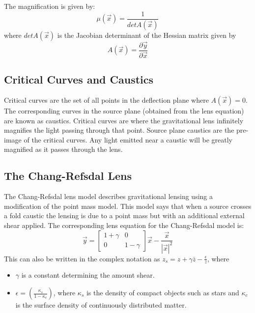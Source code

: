 \documentclass[a4paper]{IEEEtran}
\begin{document}
The magnification is given by:
\begin{equation}
    \mu(\vec{x}) = \frac{1}{det A(\vec{x})}
\end{equation}
where $det A(\vec{x})$ is the Jacobian determinant of the Hessian matrix
given by
\begin{equation}
    A(\vec{x}) = \frac{\partial \vec{y}}{\partial \vec{x}}
\end{equation}

\subsection{Critical Curves and Caustics}
Critical curves are the set of all points in the deflection plane where
$A(\vec{x}) = 0$. The corresponding curves in the source plane (obtained
from the lens equation) are known as caustics. Critical curves are where
the gravitational lens infinitely magnifies the light passing through
that point. Source plane caustics are the pre-image of the critical curves.
Any light emitted near a caustic will be greatly magnified as it passes
through the lens. 

\subsection{The Chang-Refsdal Lens}
The Chang-Refsdal lens model describes gravitational lensing using a modification
of the point mass model. This model says that when a source crosses a fold caustic
the lensing is due to a point mass but with an additional external shear applied.
The corresponding lens equation for the Chang-Refsdal model is:
\begin{equation}
    \vec{y} = \left[
                \begin{array}{cc}
                    1 + \gamma & 0   \\
                    0          & 1 - \gamma
                \end{array} 
              \right] \vec{x} - \frac{\vec{x}}{|\vec{x}|^2}
\end{equation}
This can also be written in the complex notation as 
$z_s = z + \gamma \bar{z} - \frac{\epsilon}{\bar{z}}$, where
\begin{itemize}
    \item $\gamma$ is a constant determining the amount shear.
    \item $\epsilon = (\frac{\kappa_s}{1 - \kappa_c})$, where $\kappa_s$ is
          the density of compact objects such as stars and $\kappa_c$ is the
          surface density of continuously distributed matter.
\end{itemize}
\end{document}
